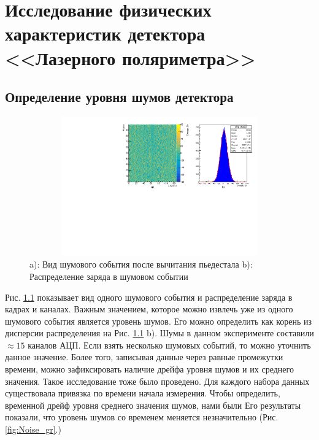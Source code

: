 \vspace{24pt}
\chapter{Исследование физических характеристик детектора <<Лазерного поляриметра>>}
\section{Определение уровня шумов детектора}
\label{sec:noise_study}
\begin{figure}[H]
	\begin{center}
		\includegraphics[width = 12cm, height = 6cm]{img/noise_map.pdf}
		\caption{a): Вид шумового события после вычитания пьедестала b): Распределение заряда в шумовом событии}
		\label{noise_map}
	\end{center}
\end{figure}
Рис. \ref{noise_map} показывает вид одного шумового события и распределение заряда в кадрах и каналах. Важным значением, которое можно извлечь уже из одного шумового события является уровень шумов. Его можно определить как корень из дисперсии распределения на Рис. \ref{noise_map} b). Шумы в данном эксперименте составили $\approx15$ каналов АЦП. Если взять несколько шумовых событий, то можно уточнить данное значение. Более того, записывая данные через равные промежутки времени, можно зафиксировать наличие дрейфа уровня шумов и их среднего значения. Такое исследование тоже было проведено. Для каждого набора данных существовала привязка по времени начала измерения. Чтобы определить, временной дрейф уровня среднего значения шумов, нами были Его результаты показали, что уровень шумов со временем меняется незначительно (Рис.\ref{fig:Noise_gr}.)

